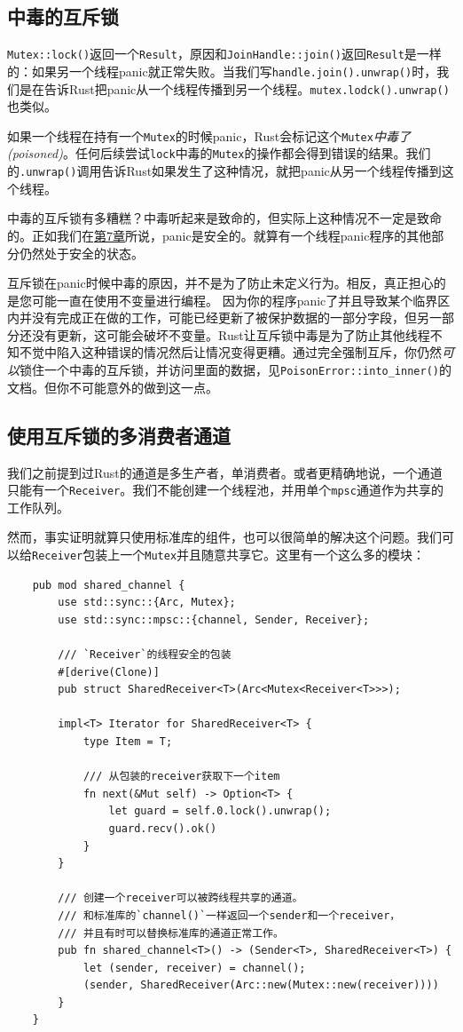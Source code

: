 \subsection{中毒的互斥锁}
\texttt{Mutex::lock()}返回一个\texttt{Result}，原因和\texttt{JoinHandle::join()}返回\texttt{Result}是一样的：如果另一个线程panic就正常失败。当我们写\texttt{handle.join().unwrap()}时，我们是在告诉Rust把panic从一个线程传播到另一个线程。\texttt{mutex.lodck().unwrap()}也类似。

如果一个线程在持有一个\texttt{Mutex}的时候panic，Rust会标记这个\texttt{Mutex}\emph{中毒了(poisoned)}。任何后续尝试\texttt{lock}中毒的\texttt{Mutex}的操作都会得到错误的结果。我们的\texttt{.unwrap()}调用告诉Rust如果发生了这种情况，就把panic从另一个线程传播到这个线程。

中毒的互斥锁有多糟糕？中毒听起来是致命的，但实际上这种情况不一定是致命的。正如我们在\hyperref[ch07]{第7章}所说，panic是安全的。就算有一个线程panic程序的其他部分仍然处于安全的状态。

互斥锁在panic时候中毒的原因，并不是为了防止未定义行为。相反，真正担心的是您可能一直在使用不变量进行编程。 因为你的程序panic了并且导致某个临界区内并没有完成正在做的工作，可能已经更新了被保护数据的一部分字段，但另一部分还没有更新，这可能会破坏不变量。Rust让互斥锁中毒是为了防止其他线程不知不觉中陷入这种错误的情况然后让情况变得更糟。通过完全强制互斥，你仍然\emph{可以}锁住一个中毒的互斥锁，并访问里面的数据，见\texttt{PoisonError::into\_inner()}的文档。但你不可能意外的做到这一点。

\subsection{使用互斥锁的多消费者通道}
我们之前提到过Rust的通道是多生产者，单消费者。或者更精确地说，一个通道只能有一个\texttt{Receiver}。我们不能创建一个线程池，并用单个\texttt{mpsc}通道作为共享的工作队列。

然而，事实证明就算只使用标准库的组件，也可以很简单的解决这个问题。我们可以给\texttt{Receiver}包装上一个\texttt{Mutex}并且随意共享它。这里有一个这么多的模块：
\begin{verbatim}
    pub mod shared_channel {
        use std::sync::{Arc, Mutex};
        use std::sync::mpsc::{channel, Sender, Receiver};

        /// `Receiver`的线程安全的包装
        #[derive(Clone)]
        pub struct SharedReceiver<T>(Arc<Mutex<Receiver<T>>>);

        impl<T> Iterator for SharedReceiver<T> {
            type Item = T;

            /// 从包装的receiver获取下一个item
            fn next(&Mut self) -> Option<T> {
                let guard = self.0.lock().unwrap();
                guard.recv().ok()
            }
        }

        /// 创建一个receiver可以被跨线程共享的通道。
        /// 和标准库的`channel()`一样返回一个sender和一个receiver，
        /// 并且有时可以替换标准库的通道正常工作。
        pub fn shared_channel<T>() -> (Sender<T>, SharedReceiver<T>) {
            let (sender, receiver) = channel();
            (sender, SharedReceiver(Arc::new(Mutex::new(receiver))))
        }
    }
\end{verbatim}

